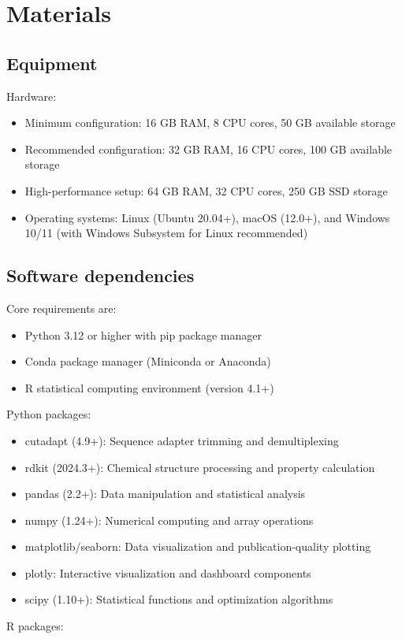 \section{Materials}

\subsection{Equipment}
Hardware:

\begin{itemize}
  \item Minimum configuration: 16 GB RAM, 8 CPU cores, 50 GB available storage
  \item Recommended configuration: 32 GB RAM, 16 CPU cores, 100 GB available storage
  \item High-performance setup: 64 GB RAM, 32 CPU cores, 250 GB SSD storage
  \item Operating systems: Linux (Ubuntu 20.04+), macOS (12.0+), and Windows 10/11 (with Windows Subsystem for Linux recommended)
\end{itemize}

\subsection{Software dependencies}
Core requirements are:

\begin{itemize}
  \item Python 3.12 or higher with pip package manager
  \item Conda package manager (Miniconda or Anaconda)
  \item R statistical computing environment (version 4.1+)
\end{itemize}
Python packages:

\begin{itemize}
  \item cutadapt (4.9+): Sequence adapter trimming and demultiplexing
  \item rdkit (2024.3+): Chemical structure processing and property calculation
  \item pandas (2.2+): Data manipulation and statistical analysis
  \item numpy (1.24+): Numerical computing and array operations
  \item matplotlib/seaborn: Data visualization and publication-quality plotting
  \item plotly: Interactive visualization and dashboard components
  \item scipy (1.10+): Statistical functions and optimization algorithms
\end{itemize}
R packages:

